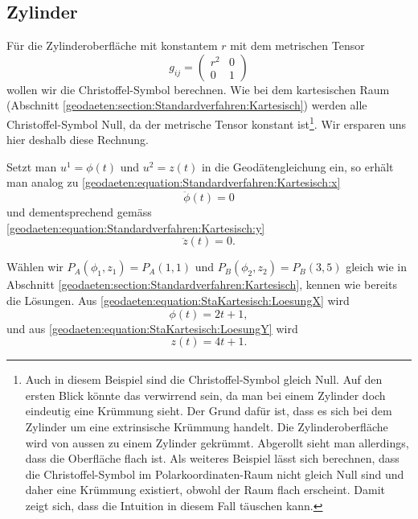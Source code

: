 %
%
%
%
\subsection{Zylinder\label{geodaeten:section:Standardverfahren:Zylinder}}

Für die Zylinderoberfläche mit konstantem $r$ mit dem metrischen Tensor 
\begin{equation}
	g_{ij} = \begin{pmatrix} 
		r^2 & 0 \\ 
		0 & 1 
	\end{pmatrix}
\end{equation}
wollen wir die Christoffel-Symbol berechnen. 
Wie bei dem kartesischen Raum (Abschnitt \ref{geodaeten:section:Standardverfahren:Kartesisch}) werden alle Christoffel-Symbol Null, da der metrische Tensor konstant ist\footnote{
Auch in diesem Beispiel sind die Christoffel-Symbol gleich Null.
Auf den ersten Blick könnte das verwirrend sein, da man bei einem Zylinder doch eindeutig eine Krümmung sieht.
Der Grund dafür ist, dass es sich bei dem Zylinder um eine extrinsische Krümmung handelt.
Die Zylinderoberfläche wird von aussen zu einem Zylinder gekrümmt.
Abgerollt sieht man allerdings, dass die Oberfläche flach ist.
Als weiteres Beispiel lässt sich berechnen, dass die Christoffel-Symbol im Polarkoordinaten-Raum nicht gleich Null sind und daher eine Krümmung existiert, obwohl der Raum flach erscheint.
Damit zeigt sich, dass die Intuition in diesem Fall täuschen kann.
}.
Wir ersparen uns hier deshalb diese Rechnung.

Setzt man $u^1 = \phi (t)$ und $u^2 = z(t)$ in die Geodätengleichung ein, so erhält man analog zu \eqref{geodaeten:equation:Standardverfahren:Kartesisch:x}
\begin{equation}
	\ddot{\phi}(t) = 0
	\label{geodaeten:equation:Standardverfahren:Zylinder:phi}
\end{equation}
und dementsprechend gemäss \eqref{geodaeten:equation:Standardverfahren:Kartesisch:y}
\begin{equation}
	\ddot{z}(t) = 0 .
\end{equation}


Wählen wir $P_A(\phi_1 , z_1) = P_A(1 , 1)$ und $P_B(\phi_2 , z_2) = P_B(3 , 5)$ gleich wie in Abschnitt \ref{geodaeten:section:Standardverfahren:Kartesisch}, kennen wie bereits die Lösungen. 
Aus \eqref{geodaeten:equation:StaKartesisch:LoesungX} wird 
\begin{equation}
	\phi(t) = 2t + 1 ,
\end{equation}
und aus \eqref{geodaeten:equation:StaKartesisch:LoesungY} wird
\begin{equation}
	z(t) = 4t + 1 .
\end{equation}

